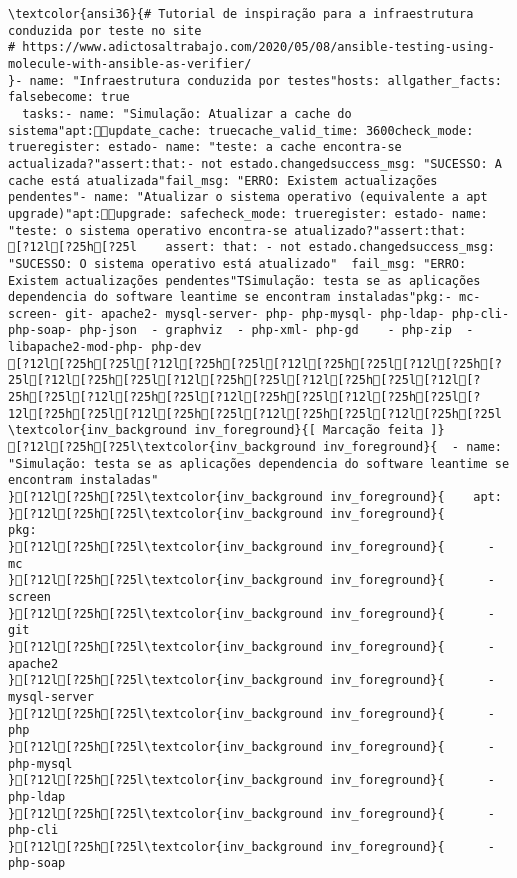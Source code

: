 \documentclass{scrartcl}
\begin{document}
\begin{Verbatim}
\textcolor{ansi36}{# Tutorial de inspiração para a infraestrutura conduzida por teste no site
# https://www.adictosaltrabajo.com/2020/05/08/ansible-testing-using-molecule-with-ansible-as-verifier/
}- name: "Infraestrutura conduzida por testes"hosts: allgather_facts: falsebecome: true
  tasks:- name: "Simulação: Atualizar a cache do sistema"apt:update_cache: truecache_valid_time: 3600check_mode: trueregister: estado- name: "teste: a cache encontra-se actualizada?"assert:that:- not estado.changedsuccess_msg: "SUCESSO: A cache está atualizada"fail_msg: "ERRO: Existem actualizações pendentes"- name: "Atualizar o sistema operativo (equivalente a apt upgrade)"apt:upgrade: safecheck_mode: trueregister: estado- name: "teste: o sistema operativo encontra-se atualizado?"assert:that:
[?12l[?25h[?25l    assert: that: - not estado.changedsuccess_msg: "SUCESSO: O sistema operativo está atualizado"  fail_msg: "ERRO: Existem actualizações pendentes"TSimulação: testa se as aplicações dependencia do software leantime se encontram instaladas"pkg:- mc- screen- git- apache2- mysql-server- php- php-mysql- php-ldap- php-cli- php-soap- php-json  - graphviz  - php-xml- php-gd    - php-zip  - libapache2-mod-php- php-dev
[?12l[?25h[?25l[?12l[?25h[?25l[?12l[?25h[?25l[?12l[?25h[?25l[?12l[?25h[?25l[?12l[?25h[?25l[?12l[?25h[?25l[?12l[?25h[?25l[?12l[?25h[?25l[?12l[?25h[?25l[?12l[?25h[?25l[?12l[?25h[?25l[?12l[?25h[?25l[?12l[?25h[?25l[?12l[?25h[?25l \textcolor{inv_background inv_foreground}{[ Marcação feita ]}
[?12l[?25h[?25l\textcolor{inv_background inv_foreground}{  - name: "Simulação: testa se as aplicações dependencia do software leantime se encontram instaladas"
}[?12l[?25h[?25l\textcolor{inv_background inv_foreground}{    apt:
}[?12l[?25h[?25l\textcolor{inv_background inv_foreground}{      pkg:
}[?12l[?25h[?25l\textcolor{inv_background inv_foreground}{      - mc
}[?12l[?25h[?25l\textcolor{inv_background inv_foreground}{      - screen
}[?12l[?25h[?25l\textcolor{inv_background inv_foreground}{      - git
}[?12l[?25h[?25l\textcolor{inv_background inv_foreground}{      - apache2
}[?12l[?25h[?25l\textcolor{inv_background inv_foreground}{      - mysql-server
}[?12l[?25h[?25l\textcolor{inv_background inv_foreground}{      - php
}[?12l[?25h[?25l\textcolor{inv_background inv_foreground}{      - php-mysql
}[?12l[?25h[?25l\textcolor{inv_background inv_foreground}{      - php-ldap
}[?12l[?25h[?25l\textcolor{inv_background inv_foreground}{      - php-cli
}[?12l[?25h[?25l\textcolor{inv_background inv_foreground}{      - php-soap

\end{Verbatim}
\end{document}
